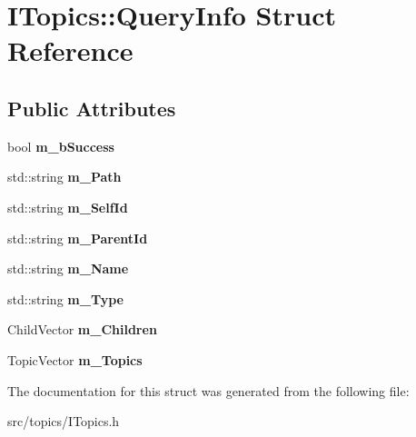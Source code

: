 \hypertarget{struct_i_topics_1_1_query_info}{}\section{I\+Topics\+:\+:Query\+Info Struct Reference}
\label{struct_i_topics_1_1_query_info}
\subsection*{Public Attributes}
\begin{DoxyCompactItemize}
\item 
\mbox{\label{struct_i_topics_1_1_query_info_a7643546aa0d6b018d1d3d5885475177b}} 
bool {\bfseries m\+\_\+b\+Success}
\item 
\mbox{\label{struct_i_topics_1_1_query_info_ad6f7b427a0d2fca0be7d64ceebf0a40c}} 
std\+::string {\bfseries m\+\_\+\+Path}
\item 
\mbox{\label{struct_i_topics_1_1_query_info_a77db346be55da4a22c3e3bb6649ebf95}} 
std\+::string {\bfseries m\+\_\+\+Self\+Id}
\item 
\mbox{\label{struct_i_topics_1_1_query_info_a4b31ec677730a2ed0119d360d7dff936}} 
std\+::string {\bfseries m\+\_\+\+Parent\+Id}
\item 
\mbox{\label{struct_i_topics_1_1_query_info_a9a5ccc45d34025dc56e45a01a41888d4}} 
std\+::string {\bfseries m\+\_\+\+Name}
\item 
\mbox{\label{struct_i_topics_1_1_query_info_a5fde862ccd38105fa12cc1f0f7b73c1e}} 
std\+::string {\bfseries m\+\_\+\+Type}
\item 
\mbox{\label{struct_i_topics_1_1_query_info_a047fdd4513b88a4ec76282b462e6d7a6}} 
Child\+Vector {\bfseries m\+\_\+\+Children}
\item 
\mbox{\label{struct_i_topics_1_1_query_info_ad2b30fd6075f4e4f94ce452ed89ce6fc}} 
Topic\+Vector {\bfseries m\+\_\+\+Topics}
\end{DoxyCompactItemize}


The documentation for this struct was generated from the following file\+:\begin{DoxyCompactItemize}
\item 
src/topics/I\+Topics.\+h\end{DoxyCompactItemize}
